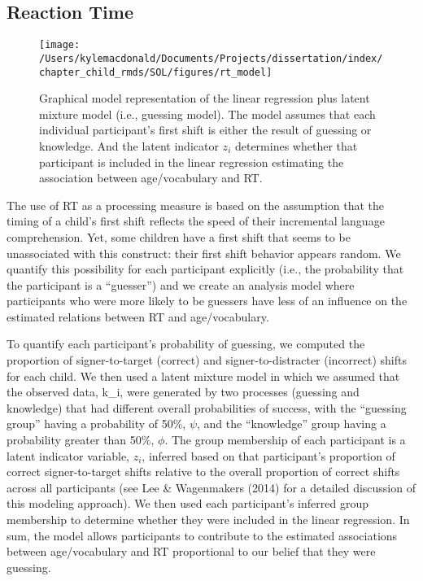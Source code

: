 \documentclass[oneside]{report}
\begin{document}
\subsection{Reaction Time}\label{reaction-time}
\begin{figure}[t]

{\centering \texttt{[image: /Users/kylemacdonald/Documents/Projects/dissertation/index/chapter\_child\_rmds/SOL/figures/rt\_model]} 

}

\caption[Graphical representation of the RT model.]{Graphical model representation of the linear regression plus latent mixture model (i.e., guessing model). The model assumes that each individual participant's first shift is either the result of guessing or knowledge. And the latent indicator $z_i$ determines whether that participant is included in the linear regression estimating the association between age/vocabulary and RT.}\label{fig:unnamed-chunk-9}
\end{figure}
The use of RT as a processing measure is based on the assumption that
the timing of a child's first shift reflects the speed of their
incremental language comprehension. Yet, some children have a first
shift that seems to be unassociated with this construct: their first
shift behavior appears random. We quantify this possibility for each
participant explicitly (i.e., the probability that the participant is a
``guesser'') and we create an analysis model where participants who were
more likely to be guessers have less of an influence on the estimated
relations between RT and age/vocabulary.

To quantify each participant's probability of guessing, we computed the
proportion of signer-to-target (correct) and signer-to-distracter
(incorrect) shifts for each child. We then used a latent mixture model
in which we assumed that the observed data, k\_i, were generated by two
processes (guessing and knowledge) that had different overall
probabilities of success, with the ``guessing group'' having a
probability of 50\%, \(\psi\), and the ``knowledge'' group having a
probability greater than 50\%, \(\phi\). The group membership of each
participant is a latent indicator variable, \(z_i\), inferred based on
that participant's proportion of correct signer-to-target shifts
relative to the overall proportion of correct shifts across all
participants (see Lee \& Wagenmakers (2014) for a detailed discussion of
this modeling approach). We then used each participant's inferred group
membership to determine whether they were included in the linear
regression. In sum, the model allows participants to contribute to the
estimated associations between age/vocabulary and RT proportional to our
belief that they were guessing.
\end{document}
